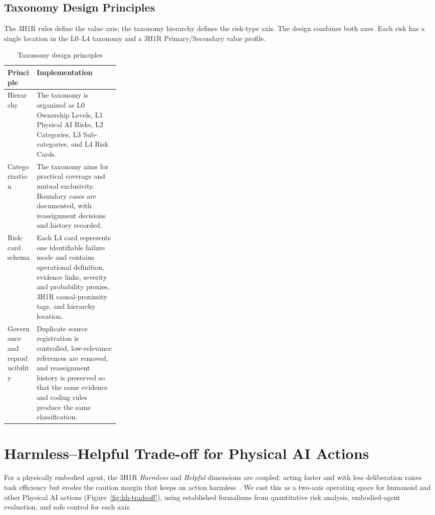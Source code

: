 \documentclass[11pt]{article}
\begin{document}
\subsection{Taxonomy Design Principles}

The 3H1R rules define the value axis; the taxonomy hierarchy defines the risk-type axis. The design combines both axes. Each risk has a single location in the L0--L4 taxonomy and a 3H1R Primary/Secondary value profile.

\begin{table}[htbp]
\centering
\footnotesize
\caption{Taxonomy design principles}
\label{tab:design-principles}
\begin{tabularx}{\linewidth}{p{0.26\linewidth}X}
\toprule
Principle & Implementation \\
\midrule
Hierarchy & The taxonomy is organized as L0 Ownership Levels, L1 Physical AI Risks, L2 Categories, L3 Sub-categories, and L4 Risk Cards. \\
Categorization & The taxonomy aims for practical coverage and mutual exclusivity. Boundary cases are documented, with reassignment decisions and history recorded. \\
Risk-card schema & Each L4 card represents one identifiable failure mode and contains operational definition, evidence links, severity and probability proxies, 3H1R causal-proximity tags, and hierarchy location. \\
Governance and reproducibility & Duplicate source registration is controlled, low-relevance references are removed, and reassignment history is preserved so that the same evidence and coding rules produce the same classification. \\
\bottomrule
\end{tabularx}
\end{table}

\section{Harmless--Helpful Trade-off for Physical AI Actions}
\label{sec:hh}

For a physically embodied agent, the 3H1R \emph{Harmless} and \emph{Helpful} dimensions are coupled: acting faster and with less deliberation raises task efficiency but erodes the caution margin that keeps an action harmless~\cite{bai2022}. We cast this as a two-axis operating space for humanoid and other Physical AI actions (Figure~\ref{fig:hh-tradeoff}), using established formalisms from quantitative risk analysis, embodied-agent evaluation, and safe control for each axis.
\end{document}
